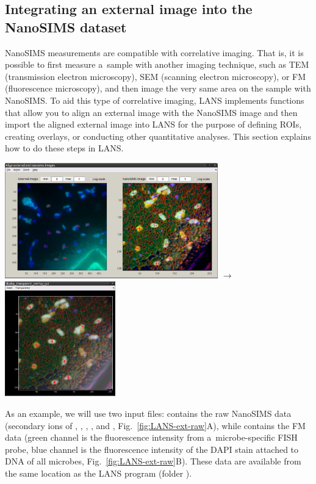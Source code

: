 \newpage
\subsection{Integrating an external image into the NanoSIMS dataset}
\setcounter{step}{0}

\goldbox{}
NanoSIMS measurements are compatible with correlative imaging. That is, it is possible to first measure a~sample with another imaging technique, such as TEM (transmission electron microscopy), SEM (scanning electron microscopy), or FM (fluorescence microscopy), and then image the very same area on the sample with NanoSIMS. To aid this type of correlative imaging, LANS implements functions that allow you to align an external image with the NanoSIMS image and then import the aligned external image into LANS for the purpose of defining ROIs, creating overlays, or conducting other quantitative analyses. This section explains how to do these steps in LANS.
\begin{center}
\includegraphics[height=5cm, valign=c]{figs7/LANS-ext-align-points}
$\rightarrow$
\includegraphics[height=5cm, valign=c]{figs7/LANS-ext-result1}
\end{center}
\tcbe

As an example, we will use two input files:  contains the raw NanoSIMS data (secondary ions of , , , ,  and , Fig.~\ref{fig:LANS-ext-raw}A), while  contains the FM data (green channel is the fluorescence intensity from a~microbe-specific FISH probe, blue channel is the fluorescence intensity of the DAPI stain attached to DNA of all microbes, Fig.~\ref{fig:LANS-ext-raw}B). These data are available from the same location as the LANS program (folder ).


